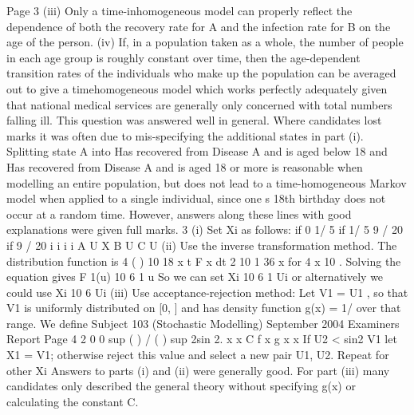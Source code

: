 Page 3
(iii) Only a time-inhomogeneous model can properly reflect the dependence of
both the recovery rate for A and the infection rate for B on the age of the
person.
(iv) If, in a population taken as a whole, the number of people in each age group is
roughly constant over time, then the age-dependent transition rates of the
individuals who make up the population can be averaged out to give a timehomogeneous
model which works perfectly adequately given that national
medical services are generally only concerned with total numbers falling ill.
This question was answered well in general. Where candidates lost marks it
was often due to mis-specifying the additional states in part (i). Splitting state
A into Has recovered from Disease A and is aged below 18 and Has
recovered from Disease A and is aged 18 or more is reasonable when
modelling an entire population, but does not lead to a time-homogeneous
Markov model when applied to a single individual, since one s 18th birthday
does not occur at a random time. However, answers along these lines with
good explanations were given full marks.
3 (i) Set Xi as follows:
if 0 1/ 5
if 1/ 5 9 / 20
if 9 / 20
i
i i
i
A U
X B U
C U
(ii) Use the inverse transformation method.
The distribution function is
4
( ) 10
18
x t F x dt
2 10
1
36
x
for 4 x 10 .
Solving the equation gives F 1(u) 10 6 1 u
So we can set Xi 10 6 1 Ui
or alternatively we could use Xi 10 6 Ui
(iii) Use acceptance-rejection method:
Let V1 = U1 , so that V1 is uniformly distributed on [0, ] and has density
function g(x) = 1/ over that range.
We define
Subject 103 (Stochastic Modelling) September 2004 Examiners Report
Page 4
2
0 0
sup ( ) / ( ) sup 2sin 2.
x x
C f x g x x
If U2 < sin2 V1 let X1 = V1; otherwise reject this value and select a new pair
U1, U2. Repeat for other Xi
Answers to parts (i) and (ii) were generally good. For part (iii) many
candidates only described the general theory without specifying g(x) or
calculating the constant C.

